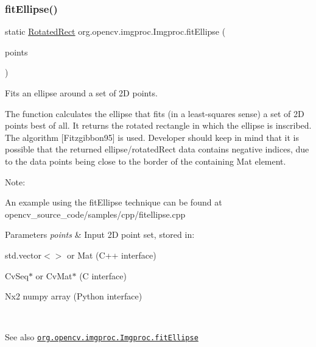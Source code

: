 \subsubsection{\texorpdfstring{fit\+Ellipse()}{fitEllipse()}}
{\footnotesize\ttfamily static \mbox{\hyperlink{classorg_1_1opencv_1_1core_1_1_rotated_rect}{Rotated\+Rect}} org.\+opencv.\+imgproc.\+Imgproc.\+fit\+Ellipse (\begin{DoxyParamCaption}\item[{\mbox{\hyperlink{classorg_1_1opencv_1_1core_1_1_mat_of_point2f}{Mat\+Of\+Point2f}}}]{points }\end{DoxyParamCaption})\hspace{0.3cm}{\ttfamily [static]}}

Fits an ellipse around a set of 2D points.

The function calculates the ellipse that fits (in a least-\/squares sense) a set of 2D points best of all. It returns the rotated rectangle in which the ellipse is inscribed. The algorithm \mbox{[}Fitzgibbon95\mbox{]} is used. Developer should keep in mind that it is possible that the returned ellipse/rotated\+Rect data contains negative indices, due to the data points being close to the border of the containing Mat element.

Note\+:


\begin{DoxyItemize}
\item An example using the fit\+Ellipse technique can be found at opencv\+\_\+source\+\_\+code/samples/cpp/fitellipse.\+cpp 
\end{DoxyItemize}


\begin{DoxyParams}{Parameters}
{\em points} & Input 2D point set, stored in\+: 
\begin{DoxyItemize}
\item {\ttfamily std.\+vector$<$$>$} or {\ttfamily Mat} (C++ interface) 
\item {\ttfamily Cv\+Seq$\ast$} or {\ttfamily Cv\+Mat$\ast$} (C interface) 
\item Nx2 numpy array (Python interface) 
\end{DoxyItemize}\\
\hline
\end{DoxyParams}
\begin{DoxySeeAlso}{See also}
\href{http://docs.opencv.org/modules/imgproc/doc/structural_analysis_and_shape_descriptors.html#fitellipse}{\tt org.\+opencv.\+imgproc.\+Imgproc.\+fit\+Ellipse} 
\end{DoxySeeAlso}
\mbox{\label{classorg_1_1opencv_1_1imgproc_1_1_imgproc_a78923d7431756fb4cb2046359b75607f}} 
